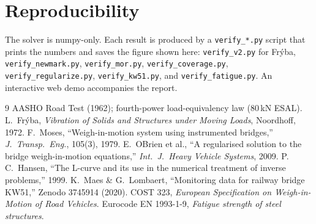 \documentclass[11pt,a4paper]{article}
\begin{document}
\section{Reproducibility}
\begin{sloppypar}
The solver is numpy-only. Each result is produced by a \texttt{verify\_*.py} script that prints the
numbers and saves the figure shown here: \texttt{verify\_v2.py} for Frýba, \texttt{verify\_newmark.py},
\texttt{verify\_mor.py}, \texttt{verify\_coverage.py}, \texttt{verify\_regularize.py},
\texttt{verify\_kw51.py}, and \texttt{verify\_fatigue.py}. An interactive web demo accompanies the
report.
\end{sloppypar}

\begin{thebibliography}{9}
\small
{} AASHO Road Test (1962); fourth-power load-equivalency law (80\,kN ESAL).
 L.\ Frýba, \emph{Vibration of Solids and Structures under Moving Loads},
  Noordhoff, 1972.
 F.\ Moses, ``Weigh-in-motion system using instrumented bridges,''
  \emph{J.\ Transp.\ Eng.}, 105(3), 1979.
 E.\ OBrien et al., ``A regularised solution to the bridge weigh-in-motion
  equations,'' \emph{Int.\ J.\ Heavy Vehicle Systems}, 2009.
 P.\,C.\ Hansen, ``The L-curve and its use in the numerical treatment of inverse
  problems,'' 1999.
 K.\ Maes \& G.\ Lombaert, ``Monitoring data for railway bridge KW51,''
  Zenodo 3745914 (2020).
 COST 323, \emph{European Specification on Weigh-in-Motion of Road Vehicles}.
 Eurocode EN 1993-1-9, \emph{Fatigue strength of steel structures}.
\end{thebibliography}
\end{document}
